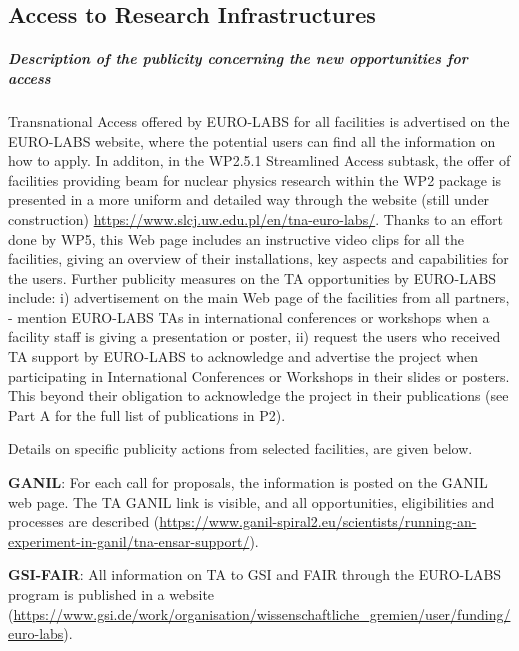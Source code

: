 \subsection{Access to Research Infrastructures}


\subparagraph{Description of the publicity concerning the new opportunities for access} \mbox{}

Transnational Access offered by EURO-LABS for all facilities is advertised on the EURO-LABS website, where the potential users can find all the information on how to apply. In additon, in the WP2.5.1 Streamlined Access subtask, the offer of facilities providing beam for nuclear physics research within the WP2 package is presented in a more uniform and detailed way  through the website (still under construction) \url{https://www.slcj.uw.edu.pl/en/tna-euro-labs/}. 
Thanks to an effort done by WP5, this Web page includes an instructive video clips for all the facilities, giving an overview of their installations, key aspects and capabilities for the users.
Further publicity measures on the TA opportunities by EURO-LABS include:
i) advertisement on the main Web page of the facilities from all partners,
- mention EURO-LABS TAs in international conferences or workshops when a facility staff is giving a presentation or poster,
ii) request the users who received TA support by EURO-LABS to acknowledge and advertise the project when participating in International Conferences or Workshops in their slides or posters. This beyond their obligation to acknowledge the project in their publications (see Part A for the full list of publications in P2).

Details on specific publicity actions from selected facilities, are given below.

\textbf{GANIL}: For each call for proposals, the information is posted on the GANIL web page. The TA GANIL link is visible, and all opportunities, eligibilities and processes are described (\url{https://www.ganil-spiral2.eu/scientists/running-an-experiment-in-ganil/tna-ensar-support/}).

\textbf{GSI-FAIR}: All information on TA to GSI and FAIR through the EURO-LABS program is published in a website
(\url{https://www.gsi.de/work/organisation/wissenschaftliche_gremien/user/funding/euro-labs}).

